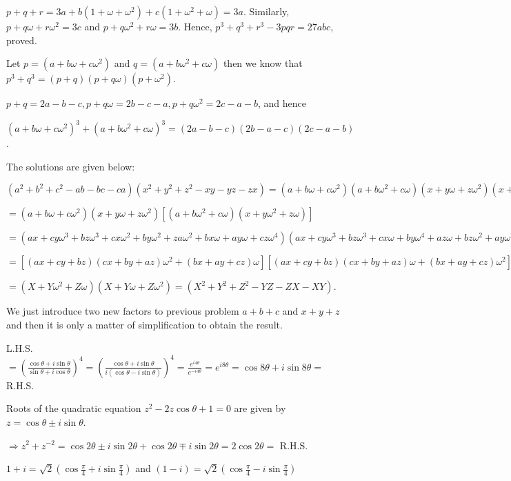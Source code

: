   $p + q + r = 3a + b(1 + \omega + \omega^2) + c(1 + \omega^2 + \omega) = 3a$. Similarly, $p + q\omega +
  r\omega^2 = 3c$ and $p + q\omega^2 + r\omega = 3b$. Hence, $p^3 + q^3 + r^3 - 3pqr = 27abc$, proved.
\item Let $p = (a + b\omega + c\omega^2)$ and $q = (a + b\omega^2 + c\omega)$ then we know that $p^3 + q^3 =
  (p + q)(p + q\omega)(p + \omega^2)$.

  $p + q = 2a - b - c, p + q\omega = 2b - c - a, p + q\omega^2 = 2c - a - b$, and hence

  $(a + b\omega + c\omega^2)^3 + (a + b\omega^2 + c\omega)^3 = (2a - b - c)(2b - a - c)(2c - a - b)$.
\item The solutions are given below:
  \startitemize[i]
  \item $(a^2 + b^2 + c^2 - ab - bc - ca)(x^2 + y^2 + z^2 - xy - yz - zx) = (a + b\omega + c\omega^2)(a +
    b\omega^2 + c\omega)(x + y\omega + z\omega^2)(x + y\omega^2 + z\omega)$

    $= (a + b\omega + c\omega^2)(x + y\omega + z\omega^2)[(a + b\omega^2 + c\omega)(x + y\omega^2 +
      z\omega)]$

    $= (ax + cy\omega^3 + bz\omega^3 + cx\omega^2 + by\omega^2 + za\omega^2 + bx\omega + ay\omega +
    cz\omega^4)(ax + cy\omega^3 + bz\omega^3 + cx\omega + by\omega^4 + az\omega + bz\omega^2 + ay\omega^2
    + cz\omega^2)$

    $= [(ax+cy+bz)(cx+by+az)\omega^2 + (bx+ay+cz)\omega][(ax+cy+bz)(cx+by+az)\omega + (bx+ay+cz)\omega^2]$

    $= (X+Y\omega^2+Z\omega)(X+Y\omega+Z\omega^2) = (X^2+Y^2+Z^2
    -YZ-ZX-XY)$.
  \item We just introduce two new factors to previous problem $a + b + c$ and $x + y + z$ and then it is
    only a matter of simplification to obtain the result.
  \stopitemize
\item L.H.S. $= \left(\frac{\cos\theta + i\sin\theta}{\sin\theta + i\cos\theta}\right)^4 =
  \left(\frac{\cos\theta + i\sin\theta}{i(\cos\theta - i\sin\theta)}\right)^4 =
  \frac{e^{i4\theta}}{e^{-i4\theta}} = e^{i8\theta} = \cos8\theta + i\sin8\theta =$ R.H.S.
\item Roots of the quadratic equation $z^2 - 2z\cos\theta + 1 = 0$ are given by $z = \cos\theta\pm
  i\sin\theta$.

  $\Rightarrow z^2 + z^{-2} = \cos2\theta \pm i\sin2\theta + \cos2\theta \mp i\sin2\theta = 2\cos2\theta =$
  R.H.S.
\item $1 + i = \sqrt{2}\left(\cos\frac{\pi}{4} + i\sin\frac{\pi}{4}\right)$ and $(1 - i) =
  \sqrt{2}\left(\cos\frac{\pi}{4} - i\sin\frac{\pi}{4}\right)$

